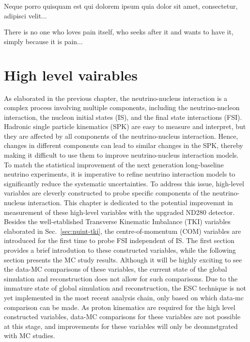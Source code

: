 \begin{savequote}[8cm]
\textlatin{Neque porro quisquam est qui dolorem ipsum quia dolor sit amet, consectetur, adipisci velit...}

There is no one who loves pain itself, who seeks after it and wants to have it, simply because it is pain...
\end{savequote}

\chapter{\label{ch:5-mcdata}High level vairables} 
\minitoc

As elaborated in the previous chapter, the neutrino-nucleus interaction is a complex process involving multiple components, including the neutrino-nucleon interaction, the nucleon initial states (IS), and the final state interactions (FSI).
Hadronic single particle kinematics (SPK) are easy to measure and interpret, but they are affected by all components of the neutrino-nucleus interaction. 
Hence, changes in different components can lead to similar changes in the SPK, thereby making it difficult to use them to improve neutrino-nucleus interaction models.
To match the statistical improvement of the next generation long-baseline neutrino experiments, it is imperative to refine neutrino interaction models to significantly reduce the systematic uncertainties.
To address this issue, high-level variables are cleverly constructed to probe specific components of the neutrino-nucleus interaction.
This chapter is dedicated to the potential improvemnt in measurement of these high-level variables with the upgraded ND280 detector.
Besides the well-etablished Transverse Kinematic Imbalance (TKI) variables elaborated in Sec.~\ref{sec:nuint-tki}, the centre-of-momentum (COM) variables are introduced for the first time to probe FSI independent of IS.
The first section provides a brief introdution to these constructed variables, while the following section presents the MC study results.
Although it will be highly exciting to see the data-MC comparisons of these variables, the current state of the global simulation and reconstruction does not allow for such comparisons.
Due to the immature state of global simulation and reconstruction, the ESC technique is not yet implemented in the most recent analysis chain, only based on which data-mc comparison can be made.
As proton kinematics are required for the high level constructed variables, data-MC comparisons for these variables are not possible at this stage, and improvements for these variables will only be deomnstgrated with MC studies.

